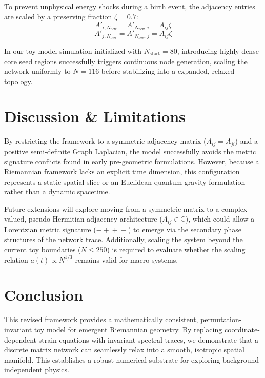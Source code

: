 \documentclass[11pt,twocolumn,a4paper]{article}
\begin{document}
To prevent unphysical energy shocks during a birth event, the adjacency entries are scaled by a preserving fraction $\zeta = 0.7$:
\begin{equation}
A'_{i,N_{\text{new}}} = A'_{N_{\text{new}},i} = A_{ij} \zeta
\end{equation}
\begin{equation}
A'_{j,N_{\text{new}}} = A'_{N_{\text{new}},j} = A_{ij} \zeta
\end{equation}

In our toy model simulation initialized with $N_{\text{start}} = 80$, introducing highly dense core seed regions successfully triggers continuous node generation, scaling the network uniformly to $N = 116$ before stabilizing into a expanded, relaxed topology.

\section{Discussion \& Limitations}
By restricting the framework to a symmetric adjacency matrix ($A_{ij}=A_{ji}$) and a positive semi-definite Graph Laplacian, the model successfully avoids the metric signature conflicts found in early pre-geometric formulations. However, because a Riemannian framework lacks an explicit time dimension, this configuration represents a static spatial slice or an Euclidean quantum gravity formulation rather than a dynamic spacetime. 

Future extensions will explore moving from a symmetric matrix to a complex-valued, pseudo-Hermitian adjacency architecture ($A_{ij} \in \mathbb{C}$), which could allow a Lorentzian metric signature ($-\!+\!+\!+$) to emerge via the secondary phase structures of the network trace. Additionally, scaling the system beyond the current toy boundaries ($N \le 250$) is required to evaluate whether the scaling relation $a(t) \propto N^{1/3}$ remains valid for macro-systems.

\section{Conclusion}
This revised framework provides a mathematically consistent, permutation-invariant toy model for emergent Riemannian geometry. By replacing coordinate-dependent strain equations with invariant spectral traces, we demonstrate that a discrete matrix network can seamlessly relax into a smooth, isotropic spatial manifold. This establishes a robust numerical substrate for exploring background-independent physics.
\end{document}
